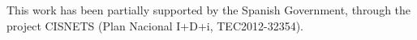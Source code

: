 This work has been partially supported by the Spanish Government, through the project CISNETS (Plan Nacional I+D+i, TEC2012-32354).
